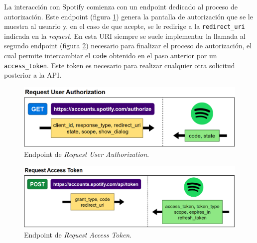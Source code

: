 La interacción con Spotify comienza con un endpoint dedicado al proceso de autorización. Este endpoint (figura \ref{fig:req_usr_auth}) genera la pantalla de autorización que se le muestra al usuario y, en el caso de que acepte, se le redirige a la \texttt{redirect\_uri} indicada en la \textit{request}. En esta URI siempre se suele implementar la llamada al segundo endpoint (figura \ref{fig:req_access_token}) necesario para finalizar el proceso de autorización, el cual permite intercambiar el \texttt{code} obtenido en el paso anterior por un \texttt{access\_token}. Este token es necesario para realizar cualquier otra solicitud posterior a la API.

\begin{figure}[H]
    \centering
    \includegraphics[width=\textwidth]{figures/request_user_auth.png}
    \caption{Endpoint de \textit{Request User Authorization}.}
    \label{fig:req_usr_auth}
\end{figure}

\begin{figure}[H]
    \centering
    \includegraphics[width=\textwidth]{figures/request_access_token.png}
    \caption{Endpoint de \textit{Request Access Token}.}
    \label{fig:req_access_token}
\end{figure}




